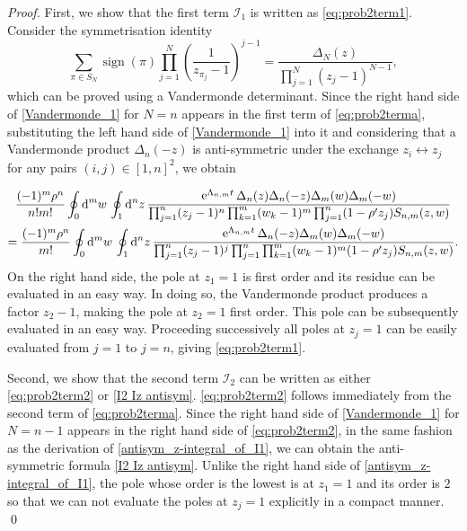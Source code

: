 \documentclass[cmp]{svjour}
\numberwithin{theorem}{section}
\numberwithin{equation}{section}
\DeclareMathOperator{\e}{e}
\def\dd{{\rm d}}
\DeclareMathOperator{\sign}{sign}
\begin{document}
\begin{proof}

First, we show that the first term $\mathcal{I}_1$ is written as \eqref{eq:prob2term1}.
Consider the symmetrisation identity
\begin{equation}
\label{Vandermonde_1}
\sum_{\pi \in S_{N}}{ \sign(\pi)\prod_{j=1}^{N}{ {\left( \frac{1}{z_{\pi_j}-1} \right)}^{j-1} } } = \frac{\Delta_{N}(z)}{ \prod_{j=1}^{N}{ {(z_j - 1)}^{N-1} } } ,
\end{equation}
which can be proved using a Vandermonde determinant.
Since the right hand side of \eqref{Vandermonde_1} for $N=n$ appears in the first term of \eqref{eq:prob2terma}, substituting the left hand side of \eqref{Vandermonde_1} into it and considering that a Vandermonde product $\Delta_{n}(-z)$ is anti-symmetric under the exchange $z_i \leftrightarrow z_j$ for any pairs $(i,j) \in {[1,n]}^2$, we obtain

\begin{multline}
\label{antisym_z-integral_of_I1}
 \frac{ (-1)^m  \rho^n  }{n!m!}\oint_{ 0} \dd^m w\,  \oint_{1} \dd^n z\,  \frac{ \e^{\Lambda_{n,m} t} \Delta_n(z) \Delta_n(-z) \Delta_m(w) \Delta_m(-w)}  
{ \prod_{j=1}^n (z_j-1)^{n} \prod_{k=1}^m (w_k-1)^{m} \prod_{j=1}^n (1- \rho' z_j)  S_{n,m}(z,w)} \\
= \frac{ (-1)^m  \rho^n  }{m!}\oint_{ 0} 
\dd^m w\,  \oint_{1} \dd^n z\,  \frac{  \e^{\Lambda_{n,m} t} \Delta_n(-z)  \Delta_m(w) \Delta_m(-w) }
{ \prod_{j=1}^n (z_j-1)^{j}\prod_{j=1}^n \prod_{k=1}^m (w_k-1)^{m} (1- \rho' z_j)  S_{n,m}(z,w)}.
\end{multline}
On the right hand side, the pole at $z_1=1$ is first order and its residue can be evaluated in an easy way. In doing so, the Vandermonde product produces a factor $z_{2}-1$, making the pole at $z_{2}=1$ first order. This pole can be subsequently evaluated in an easy way. Proceeding successively all poles at $z_j=1$ can be easily evaluated from $j=1$ to $j=n$, giving \eqref{eq:prob2term1}. 

Second, we show that the second term $\mathcal{I}_2$ can be written as either \eqref{eq:prob2term2} or \eqref{I2 Iz antisym}.
\eqref{eq:prob2term2} follows immediately from the second term of \eqref{eq:prob2terma}.
Since the right hand side of \eqref{Vandermonde_1} for $N=n-1$ appears in the right hand side of \eqref{eq:prob2term2}, in the same fashion as the derivation of \eqref{antisym_z-integral_of_I1}, we can obtain the anti-symmetric formula \eqref{I2 Iz antisym}.
Unlike the right hand side of \eqref{antisym_z-integral_of_I1}, the pole whose order is the lowest is at $z_1 = 1$ and its order is $2$ so that we can not evaluate the poles at $z_j=1$ explicitly in a compact manner.  \qed
\end{proof}
\end{document}
